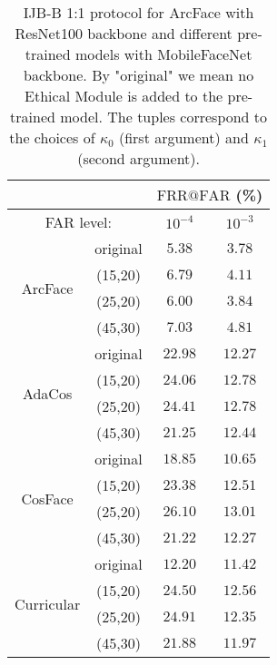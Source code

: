 \documentclass[nohyperref]{article}
\theoremstyle{plain}
\theoremstyle{definition}
\theoremstyle{remark}
\begin{document}
\begin{table}
\centering
\caption{IJB-B 1:1 protocol for ArcFace with ResNet100 backbone and different pre-trained models with MobileFaceNet backbone. By "original" we mean no Ethical Module is added to the pre-trained model. The tuples correspond to the choices of $\kappa_0$ (first argument) and $\kappa_1$ (second argument).}
\begin{tabular}{ c | c | c | c}

 & & \multicolumn{2}{c}{$\mathrm{FRR}@\mathrm{FAR}$ (\%)} \\ \hline \hline
 \multicolumn{2}{c}{ FAR level: }         & $10^{-4}$ & $10^{-3}$ \\  
 \hline \hline
                              & original  & $5.38$ & $3.78$  \\
  \multirow{2}{*}{ArcFace}    & (15,20) & $6.79$ & $4.11$  \\
                              & (25,20) & $6.00$ & $3.84$  \\
                              & (45,30) & $7.03$ & $4.81$  \\ \hline   \hline   
                              & original  & $22.98$& $12.27$  \\
  \multirow{2}{*}{AdaCos}     & (15,20) & $24.06$& $12.78$  \\
                              & (25,20) & $24.41$& $12.78$  \\
                              & (45,30) & $21.25$& $12.44$  \\ \hline 
                              & original  & $18.85$& $10.65$  \\
\multirow{2}{*}{CosFace}      & (15,20) & $23.38$& $12.51$  \\
                              & (25,20) & $26.10$& $13.01$  \\
                              & (45,30) & $21.22$& $12.27$  \\ \hline 
                              & original  & $12.20$& $11.42$  \\
  \multirow{2}{*}{Curricular} & (15,20) & $24.50$& $12.56$  \\
                              & (25,20) & $24.91$& $12.35$  \\
                              & (45,30) & $21.88$& $11.97$  \\ \hline 
\end{tabular}
\label{tab:table9}
\end{table} 
\end{document}
